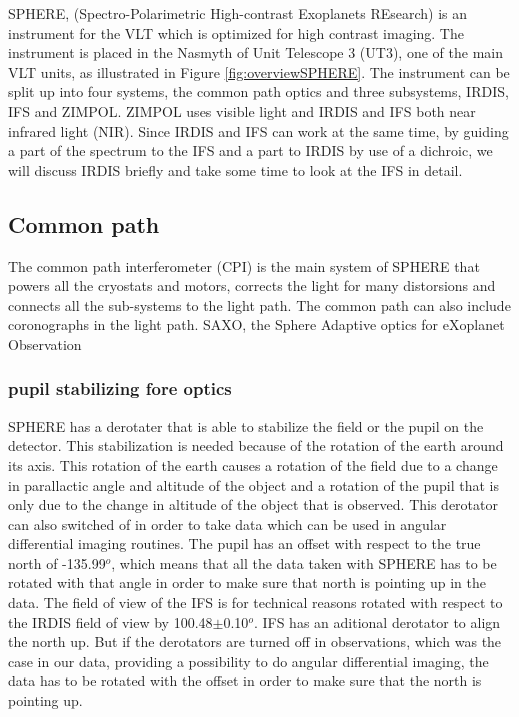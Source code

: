 \documentclass[twoside,single]{lion-msc}
\begin{document}
SPHERE, (Spectro-Polarimetric High-contrast Exoplanets REsearch) is an instrument for the VLT which is optimized for high contrast imaging. The instrument is placed in the Nasmyth  of Unit Telescope 3 (UT3), one of the main VLT units, as illustrated in Figure \ref{fig:overviewSPHERE}. The instrument can be split up into four systems, the common path optics and three subsystems, IRDIS, IFS and ZIMPOL. ZIMPOL uses visible light and IRDIS and IFS both near infrared light (NIR). Since IRDIS and IFS can work at the same time, by guiding a part of the spectrum to the IFS and a part to IRDIS by use of a dichroic, we will discuss IRDIS briefly and take some time to look at the IFS in detail.

\subsection{Common path}
The common path interferometer (CPI) is the main system of SPHERE that powers all the cryostats and motors, corrects the light for many distorsions and connects all the sub-systems to the light path. The common path can also include coronographs in the light path. SAXO, the Sphere Adaptive optics for eXoplanet Observation 

\subsubsection{pupil stabilizing fore optics}
SPHERE has a derotater that is able to stabilize the field or the pupil on the detector. This stabilization is needed because of the rotation of the earth around its axis. This rotation of the earth causes a rotation of the field due to a change in parallactic angle and altitude of the object and a rotation of the pupil that is only due to the change in altitude of the object that is observed. This derotator can also switched of in order to take data which can be used in angular differential imaging routines. The pupil has an offset with respect to the true north of -135.99$^o$, which means that all the data taken with SPHERE has to be rotated with that angle in order to make sure that north is pointing up in the data. The field of view of the IFS is for technical reasons rotated with respect to the IRDIS field of view by 100.48$\pm$0.10$^o$. IFS has an aditional derotator to align the north up. But if the derotators are turned off in observations, which was the case in our data, providing a possibility to do angular differential imaging, the data has to be rotated with the offset in order to make sure that the north is pointing up. %
\bigskip
\end{document}
